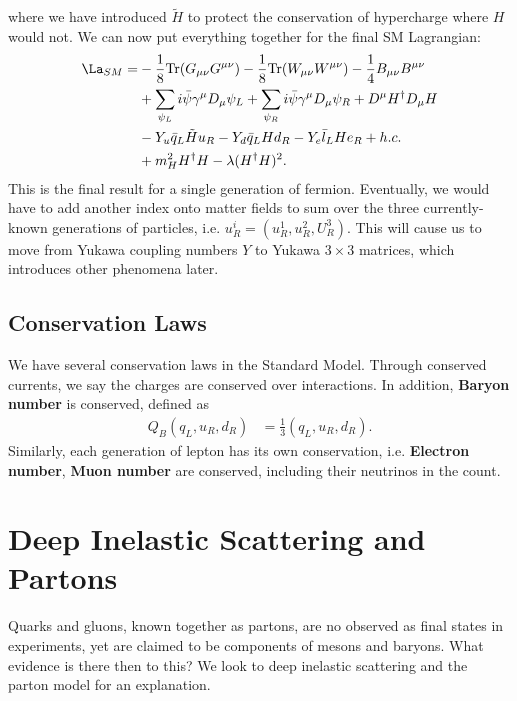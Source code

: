 \documentclass[relqm.tex]{subfiles}
\begin{document}
where we have introduced $\tilde{H}$ to protect the conservation of hypercharge where $H$ would not.
We can now put everything together for the final SM Lagrangian:
\begin{align}
    \begin{split}
        \La_{SM} = &-\frac18\text{Tr}(G_{\mu\nu}G^{\mu\nu}) - \frac18\text{Tr}(W_{\mu\nu}W^{\mu\nu}) - \frac14B_{\mu\nu}B^{\mu\nu} \\
                   &+ \sum_{\psi_L}i\bar{\psi}\gamma^\mu D_\mu\psi_L + \sum_{\psi_R} i\bar{\psi}\gamma^\mu D_\mu \psi_R + D^\mu H^\dagger D_\mu H \\
                   &- Y_u\bar{q}_L\tilde{H}u_R - Y_d\bar{q}_LHd_R - Y_e\bar{l}_LHe_R + h.c. \\
                   &+ m_H^2 H^\dagger H - \lambda(H^\dagger H)^2.
    \end{split}
\end{align}
This is the final result for a single generation of fermion. 
Eventually, we would have to add another index onto matter fields to sum over the three currently-known generations of particles, i.e. $u_R^i = (u_R^1,u_R^2,U_R^3)$.
This will cause us to move from Yukawa coupling numbers $Y$ to Yukawa $3\times3$ matrices, which introduces other phenomena later.

\section{Conservation Laws}
We have several conservation laws in the Standard Model. 
Through conserved currents, we say the charges are conserved over interactions. 
In addition, \textbf{Baryon number} is conserved, defined as
\begin{align}
    Q_B(q_L,u_R,d_R) &= \frac13(q_L,u_R,d_R).
\end{align}
Similarly, each generation of lepton has its own conservation, i.e. \textbf{Electron number}, \textbf{Muon number} are conserved, including their neutrinos in the count. 

\chapter{Deep Inelastic Scattering and Partons}
Quarks and gluons, known together as partons, are no observed as final states in experiments, yet are claimed to be components of mesons and baryons. 
What evidence is there then to this? 
We look to deep inelastic scattering and the parton model for an explanation.
\end{document}
